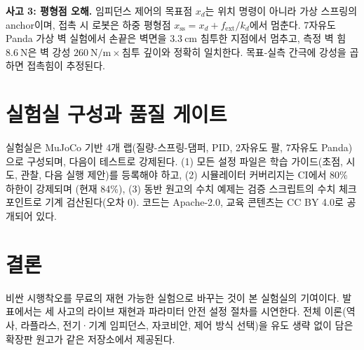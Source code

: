 \documentclass[10pt,a4paper,twocolumn]{article}
\begin{document}
\textbf{사고 3: 평형점 오해.}
임피던스 제어의 목표점 \(x_d\)는 위치 명령이 아니라 가상 스프링의
anchor이며, 접촉 시 로봇은 하중 평형점
\(x_{\mathrm{ss}}=x_d+f_{\mathrm{ext}}/k_d\)에서 멈춘다.
7자유도 Panda 가상 벽 실험에서 손끝은 벽면을 \(3.3~\mathrm{cm}\) 침투한
지점에서 멈추고, 측정 벽 힘 \(8.6~\mathrm{N}\)은 벽 강성
\(260~\mathrm{N/m}\times\)침투 깊이와 정확히 일치한다.
목표-실측 간극에 강성을 곱하면 접촉힘이 추정된다.

\section{실험실 구성과 품질 게이트}

실험실은 MuJoCo 기반 4개 랩(질량-스프링-댐퍼, PID, 2자유도 팔,
7자유도 Panda)으로 구성되며, 다음이 테스트로 강제된다.
(1) 모든 설정 파일은 학습 가이드(초점, 시도, 관찰, 다음 실행 제안)를
등록해야 하고, (2) 시뮬레이터 커버리지는 CI에서 80\% 하한이 강제되며
(현재 84\%), (3) 동반 원고의 수치 예제는 검증 스크립트의 수치
체크포인트로 기계 검산된다(오차 0).
코드는 Apache-2.0, 교육 콘텐츠는 CC BY 4.0로 공개되어 있다.

\section{결론}

비싼 시행착오를 무료의 재현 가능한 실험으로 바꾸는 것이 본 실험실의
기여이다.
발표에서는 세 사고의 라이브 재현과 파라미터 안전 설정 절차를 시연한다.
전체 이론(역사, 라플라스, 전기·기계 임피던스, 자코비안, 제어 방식
선택)을 유도 생략 없이 담은 확장판 원고가 같은 저장소에서 제공된다.
\end{document}

